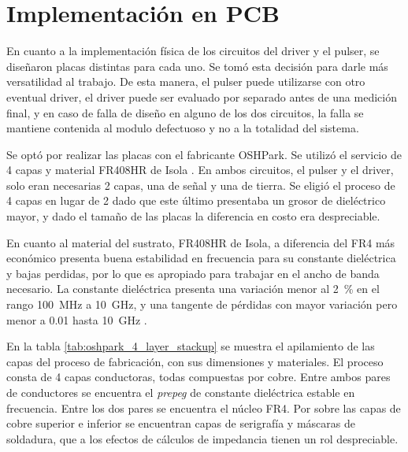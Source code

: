 \section{Implementación en PCB}

En cuanto a la implementación física de los circuitos del driver y el pulser, se
diseñaron placas distintas para cada uno. Se tomó esta decisión para darle
más versatilidad al trabajo. De esta manera, el pulser puede utilizarse con otro
eventual driver, el driver puede ser evaluado por separado antes de una medición
final, y en caso de falla de diseño en alguno de los dos circuitos, la falla se
mantiene contenida al modulo defectuoso y no a la totalidad del sistema.

Se optó por realizar las placas con el fabricante OSHPark. Se utilizó el servicio de 4
capas y material FR408HR de Isola \cite{fr408_datasheet}. En ambos circuitos, el
pulser y el driver, solo eran necesarias 2 capas, una de señal y una de tierra.
Se eligió el proceso de 4 capas en lugar de 2 dado que este último presentaba
un grosor de dieléctrico mayor, y dado el tamaño de las placas la diferencia en
costo era despreciable.

En cuanto al material del sustrato, FR408HR de Isola, a diferencia del FR4 más
económico presenta buena estabilidad en frecuencia para su constante
dieléctrica y bajas perdidas, por lo que es apropiado para trabajar en el ancho
de banda necesario. La constante dieléctrica presenta una variación menor al
\qty{2}{\percent} en el rango \qty{100}{\mega\hertz} a \qty{10}{\giga\hertz}, y
una tangente de pérdidas con mayor variación pero menor a \num{0.01} hasta
\qty{10}{\giga\hertz} \cite{fr408_datasheet}.

En la tabla \ref{tab:oshpark_4_layer_stackup} se muestra el apilamiento de las
capas del proceso de fabricación, con sus dimensiones y materiales. El proceso
consta de 4 capas conductoras, todas compuestas por cobre. Entre ambos pares de
conductores se encuentra el \textit{prepeg} de constante dieléctrica estable en
frecuencia. Entre los dos pares se encuentra el núcleo FR4. Por sobre las capas de
cobre superior e inferior se encuentran capas de serigrafía y máscaras de
soldadura, que a los efectos de cálculos de impedancia tienen un rol
despreciable.


